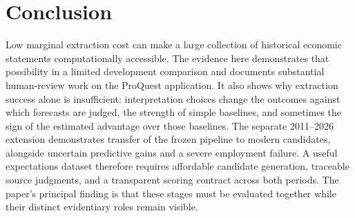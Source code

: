 \section{Conclusion}
Low marginal extraction cost can make a large collection of historical economic statements computationally accessible. The evidence here demonstrates that possibility in a limited development comparison and documents substantial human-review work on the ProQuest application. It also shows why extraction success alone is insufficient: interpretation choices change the outcomes against which forecasts are judged, the strength of simple baselines, and sometimes the sign of the estimated advantage over those baselines. The separate 2011--2026 extension demonstrates transfer of the frozen pipeline to modern candidates, alongside uncertain predictive gains and a severe employment failure. A useful expectations dataset therefore requires affordable candidate generation, traceable source judgments, and a transparent scoring contract across both periods. The paper's principal finding is that these stages must be evaluated together while their distinct evidentiary roles remain visible.


